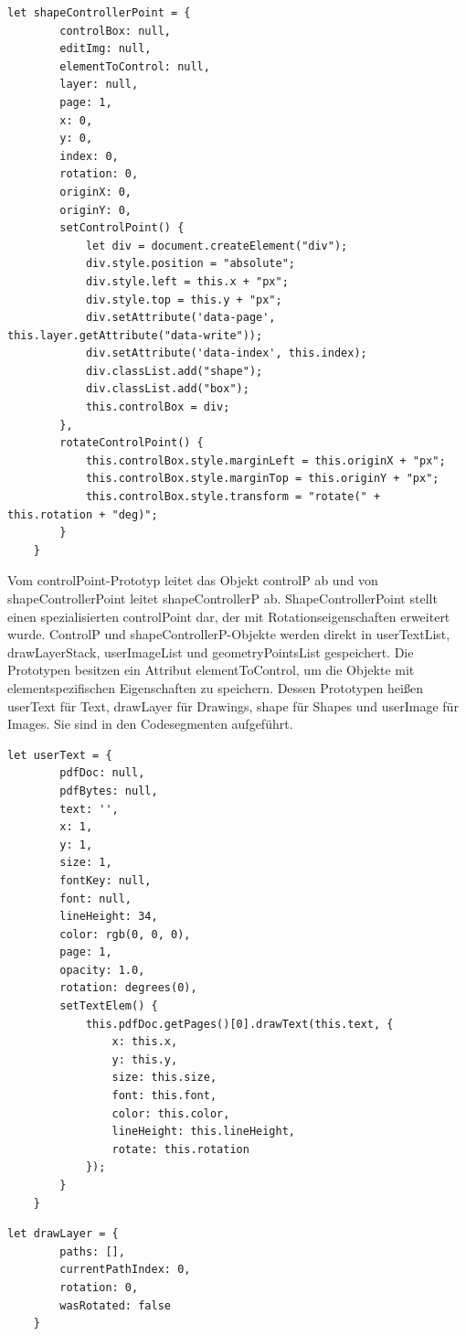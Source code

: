 \begin{lstlisting}[style=ES6, caption={Prototyp-Objekt für die Node-Struktur von Shape}, label=code:shape-controller-point, breaklines=true]
	let shapeControllerPoint = {
		controlBox: null,
		editImg: null,
		elementToControl: null,
		layer: null,
		page: 1, 
		x: 0,
		y: 0,
		index: 0, 
		rotation: 0,
		originX: 0,
		originY: 0,
		setControlPoint() {
			let div = document.createElement("div");
			div.style.position = "absolute";
			div.style.left = this.x + "px";
			div.style.top = this.y + "px";
			div.setAttribute('data-page', this.layer.getAttribute("data-write"));
			div.setAttribute('data-index', this.index);
			div.classList.add("shape");
			div.classList.add("box");
			this.controlBox = div;
		},
		rotateControlPoint() {
			this.controlBox.style.marginLeft = this.originX + "px";
			this.controlBox.style.marginTop = this.originY + "px";
			this.controlBox.style.transform = "rotate(" + this.rotation + "deg)";
		}
	}
\end{lstlisting}  

Vom controlPoint-Prototyp leitet das Objekt controlP ab und von shapeControllerPoint leitet shapeControllerP ab. ShapeControllerPoint stellt einen spezialisierten controlPoint dar, der mit Rotationseigenschaften erweitert wurde. ControlP und shapeControllerP-Objekte werden direkt in userTextList, drawLayerStack, userImageList und geometryPointsList gespeichert.
Die Prototypen besitzen ein Attribut elementToControl, um die Objekte mit elementspezifischen Eigenschaften zu speichern. Dessen Prototypen heißen userText für Text, drawLayer für Drawings, shape für Shapes und userImage für Images. Sie sind in den Codesegmenten aufgeführt.

\begin{lstlisting}[style=ES6, caption={Prototyp-Objekt für die textspezifischen Eigenschaften}, label=code:user-text, breaklines=true]
	let userText = {
		pdfDoc: null,
		pdfBytes: null,
		text: '',
		x: 1,
		y: 1,
		size: 1,
		fontKey: null,
		font: null,
		lineHeight: 34,
		color: rgb(0, 0, 0),
		page: 1,
		opacity: 1.0,
		rotation: degrees(0),
		setTextElem() {
			this.pdfDoc.getPages()[0].drawText(this.text, {
				x: this.x,
				y: this.y,
				size: this.size,
				font: this.font,
				color: this.color,
				lineHeight: this.lineHeight,
				rotate: this.rotation
			});
		}
	}
\end{lstlisting}

\begin{lstlisting}[style=ES6, caption={Prototyp-Objekt für die drawingspezifischen Eigenschaften}, label=code:draw-layer, breaklines=true]
	let drawLayer = {
		paths: [],
		currentPathIndex: 0, 
		rotation: 0,
		wasRotated: false
	}
\end{lstlisting}

